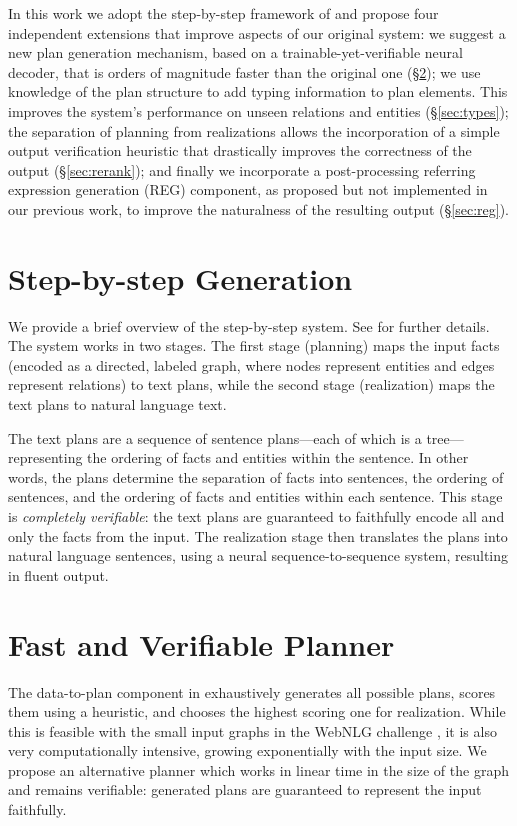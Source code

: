 \documentclass[11pt,a4paper,table,xcdraw]{article}
\newcommand{\am}[1]{\textcolor{blue}{[AM:#1]}}
\begin{document}
In this work we adopt the step-by-step framework of \citet{step-by-step} and propose four independent extensions that improve aspects of our original system: we suggest a new plan generation mechanism, based on a trainable-yet-verifiable neural decoder, that is orders of magnitude faster than the original one (\S\ref{sec:planner}); we use knowledge of the plan structure to add typing information to plan elements. This improves the system's performance on unseen relations and entities (\S\ref{sec:types});  the separation of planning from realizations allows the incorporation of a simple output verification heuristic that drastically improves the correctness of the output (\S\ref{sec:rerank}); and finally we incorporate a post-processing referring expression generation (REG) component, as proposed but not implemented in our previous work, to improve the naturalness of the resulting output (\S\ref{sec:reg}).

\section{Step-by-step Generation}
We provide a brief overview of the step-by-step system. See \citet{step-by-step} for further details.
The system works in two stages. The first stage (planning) maps the input facts (encoded as a directed, labeled graph, where nodes represent entities and edges represent relations) to text plans, while the second stage (realization) maps the text plans to natural language text. 

The text plans are a sequence of sentence plans---each of which is a tree--- 
representing the ordering of facts and entities within the sentence. In other words, the plans determine the separation of facts into sentences, the ordering of sentences, and the ordering of facts and entities within each sentence. This stage is \emph{completely verifiable}: the text plans are guaranteed to faithfully encode all and only the facts from the input.
The realization stage then translates the plans into natural language sentences, using a neural sequence-to-sequence system, resulting in fluent output. 

\section{Fast and Verifiable Planner}
\label{sec:planner}
The data-to-plan component in \citet{step-by-step} exhaustively generates all possible plans, scores them using a heuristic, and chooses the highest scoring one for realization. %
While this is feasible with the small input graphs in the WebNLG challenge \cite{colin2016webnlg}, it is also very computationally intensive, growing exponentially with the input size. We propose an alternative planner which works in linear time in the size of the graph and remains verifiable: generated plans are guaranteed to represent the input faithfully.
\end{document}
